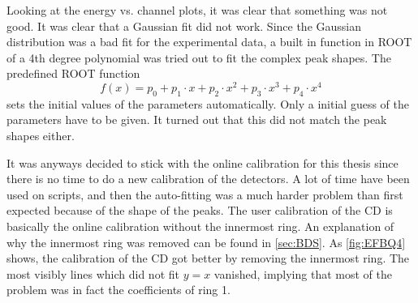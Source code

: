 \documentclass[twoside,english]{uiofysmaster/uiofysmaster}
\let\orgautoref\autoref
\renewcommand{\autoref}
        {%
		 \def\sectionautorefname{Section}%
		 \def\subsectionautorefname{Section}%
		 \def\subsubsectionautorefname{Section}%
		 \def\chapterautorefname{Chapter}%
          \orgautoref}
\begin{document}
Looking at the energy vs. channel plots, it was clear that something was not good.
It was clear that a Gaussian fit did not work. 
Since the Gaussian distribution was a bad fit for the experimental data, a built in function in ROOT of a 4th degree polynomial was tried out to fit the complex peak shapes. 
The predefined ROOT function 
\begin{equation}
	f(x) = p_0 + p_1 \cdot x + p_2 \cdot x^2 + p_3 \cdot x^3 + p_4 \cdot x^4
\end{equation}
sets the initial values of the parameters automatically. 
Only a initial guess of the parameters have to be given.
It turned out that this did not match the peak shapes either. 

It was anyways decided to stick with the online calibration for this thesis since there is no time to do a new calibration of the detectors. 
A lot of time have been used on scripts, and then the auto-fitting was a much harder problem than first expected because of the shape of the peaks.
The user calibration of the CD is basically the online calibration without the innermost ring. 
An explanation of why the innermost ring was removed can be found in  \autoref{sec:BDS}. 
As \autoref{fig:EFBQ4} shows, the calibration of the CD got better by removing the innermost ring. 
The most visibly lines which did not fit $y = x$ vanished, implying that most of the problem was in fact the coefficients of ring 1. 
\end{document}
